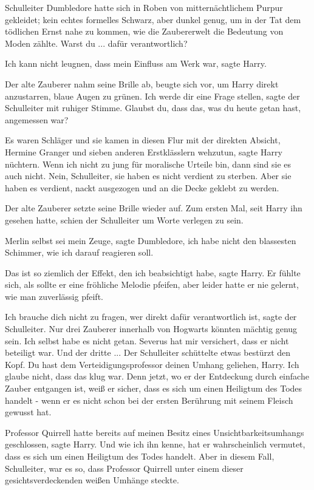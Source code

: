 Schulleiter Dumbledore hatte sich in Roben von mitternächtlichem Purpur
gekleidet; kein echtes formelles Schwarz, aber dunkel genug, um in der Tat dem
tödlichen Ernst nahe zu kommen, wie die Zaubererwelt die Bedeutung von Moden
zählte. \glqq Warst du ... dafür verantwortlich?\grqq{}

\glqq Ich kann nicht leugnen, dass mein Einfluss am Werk war\grqq{}, sagte
Harry.

Der alte Zauberer nahm seine Brille ab, beugte sich vor, um Harry direkt
anzustarren, blaue Augen zu grünen. \glqq Ich werde dir eine Frage
stellen\grqq{}, sagte der Schulleiter mit ruhiger Stimme. \glqq Glaubst du, dass
das, was du heute getan hast, angemessen war?\grqq{}

\glqq Es waren Schläger und sie kamen in diesen Flur mit der direkten Absicht,
Hermine Granger und sieben anderen Erstklässlern wehzutun\grqq{}, sagte Harry
nüchtern. \glqq Wenn ich nicht zu jung für moralische Urteile bin, dann sind sie
es auch nicht. Nein, Schulleiter, sie haben es nicht verdient zu sterben. Aber
sie haben es verdient, nackt ausgezogen und an die Decke geklebt zu
werden.\grqq{}

Der alte Zauberer setzte seine Brille wieder auf. Zum ersten Mal, seit Harry ihn
gesehen hatte, schien der Schulleiter um Worte verlegen zu sein.

\glqq Merlin selbst sei mein Zeuge\grqq{}, sagte Dumbledore, \glqq ich habe
nicht den blassesten Schimmer, wie ich darauf reagieren soll.\grqq{}

\glqq Das ist so ziemlich der Effekt, den ich beabsichtigt habe\grqq{}, sagte
Harry. Er fühlte sich, als sollte er eine fröhliche Melodie pfeifen, aber leider
hatte er nie gelernt, wie man zuverlässig pfeift.

\glqq Ich brauche dich nicht zu fragen, wer direkt dafür verantwortlich
ist\grqq{}, sagte der Schulleiter. \glqq Nur drei Zauberer innerhalb von
Hogwarts könnten mächtig genug sein. Ich selbst habe es nicht getan. Severus hat
mir versichert, dass er nicht beteiligt war. Und der dritte ...\grqq{} Der
Schulleiter schüttelte etwas bestürzt den Kopf. \glqq Du hast dem
Verteidigungsprofessor deinen Umhang geliehen, Harry. Ich glaube nicht, dass das
klug war. Denn jetzt, wo er der Entdeckung durch einfache Zauber entgangen ist,
weiß er sicher, dass es sich um einen Heiligtum des Todes handelt - wenn er es
nicht schon bei der ersten Berührung mit seinem Fleisch gewusst hat.\grqq{}

\glqq Professor Quirrell hatte bereits auf meinen Besitz eines
Unsichtbarkeitsumhangs geschlossen\grqq{}, sagte Harry. \glqq Und wie ich ihn
kenne, hat er wahrscheinlich vermutet, dass es sich um einen Heiligtum des Todes
handelt. Aber in diesem Fall, Schulleiter, war es so, dass Professor Quirrell
unter einem dieser gesichtsverdeckenden weißen Umhänge steckte.\grqq{}

